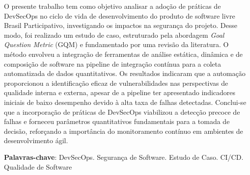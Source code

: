 \begin{resumo}
    O presente trabalho tem como objetivo analisar a adoção de práticas de DevSecOps no ciclo de vida de desenvolvimento do produto de software livre Brasil Participativo, investigando os impactos na segurança do projeto. 
    Desse modo, foi realizado um estudo de caso, estruturado pela abordagem \textit{Goal Question Metric} (GQM) e fundamentado por uma revisão da literatura. 
    O método envolveu a integração de ferramentas de análise estática, dinâmica e de composição de software na pipeline de integração contínua para a coleta automatizada de dados quantitativos. 
    Os resultados indicaram que a automação proporcionou a identificação eficaz de vulnerabilidades nas perspectivas de qualidade interna e externa, apesar de a pipeline ter apresentado indicadores iniciais de baixo desempenho devido à alta taxa de falhas detectadas. 
    Conclui-se que a incorporação de práticas de DevSecOps viabilizou a detecção precoce de falhas e forneceu parâmetros quantitativos fundamentais para a tomada de decisão, reforçando a importância do monitoramento contínuo em ambientes de desenvolvimento ágil.
 \vspace{\onelineskip}
    
 \noindent
 \textbf{Palavras-chave}: DevSecOps. Segurança de Software. Estudo de Caso. CI/CD. Qualidade de Software
\end{resumo}
